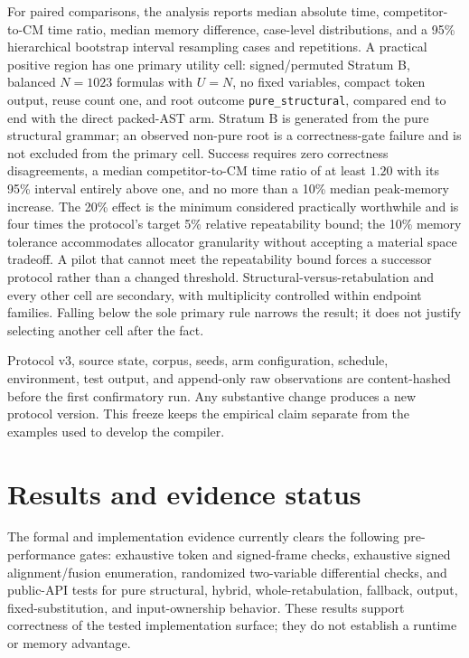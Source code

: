 \documentclass[11pt]{article}
\begin{document}
For paired comparisons, the analysis reports median absolute time, competitor-
to-CM time ratio, median memory difference, case-level distributions, and a
95\% hierarchical bootstrap interval resampling cases and repetitions. A
practical positive region has one primary utility cell: signed/permuted
Stratum B, balanced $N=1023$ formulas with $U=N$, no fixed variables, compact
token output, reuse count one, and root outcome
\texttt{pure\_structural}, compared end to end with the direct packed-AST arm.
Stratum B is generated from the pure structural grammar; an observed non-pure
root is a correctness-gate failure and is not excluded from the primary cell.
Success requires zero correctness disagreements, a median competitor-to-CM
time ratio of at least $1.20$ with its 95\% interval entirely above one, and no
more than a 10\% median peak-memory increase. The 20\% effect is the minimum
considered practically worthwhile and is four times the protocol's target 5\%
relative repeatability bound; the 10\% memory tolerance accommodates allocator
granularity without accepting a material space tradeoff. A pilot that cannot
meet the repeatability bound forces a successor protocol rather than a changed
threshold. Structural-versus-retabulation and every other cell are secondary,
with multiplicity controlled within endpoint families. Falling below the sole
primary rule narrows the result; it does not justify selecting another cell
after the fact.

Protocol v3, source state, corpus, seeds, arm configuration, schedule,
environment, test output, and append-only raw observations are content-hashed
before the first confirmatory run. Any substantive change produces a new
protocol version. This freeze keeps the empirical claim separate from the
examples used to develop the compiler.

\section{Results and evidence status}
\label{sec:results}

The formal and implementation evidence currently clears the following
pre-performance gates: exhaustive token and signed-frame checks, exhaustive
signed alignment/fusion enumeration, randomized two-variable differential
checks, and public-API tests for pure structural, hybrid, whole-retabulation,
fallback, output, fixed-substitution, and input-ownership behavior. These
results support correctness of the tested
implementation surface; they do not establish a runtime or memory advantage.
\end{document}
